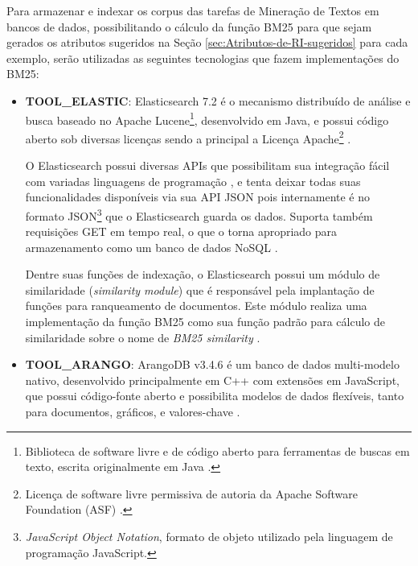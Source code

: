     Para armazenar e indexar os corpus das tarefas de Mineração de Textos em bancos de dados, possibilitando o cálculo da função BM25 para que sejam gerados os atributos sugeridos na Seção \ref{sec:Atributos-de-RI-sugeridos} para cada exemplo, serão utilizadas as seguintes tecnologias que fazem implementações do BM25:
    \begin{itemize}
        \item \textbf{TOOL\_ELASTIC}: Elasticsearch 7.2 é o mecanismo distribuído de análise e busca baseado no Apache Lucene\footnote{Biblioteca de software livre e de código aberto para ferramentas de buscas em texto, escrita originalmente em Java \cite{LUCENE_DOCUMENTATION_2019}.}, desenvolvido em Java, e possui código aberto sob diversas licenças sendo a principal a Licença Apache\footnote{Licença de software livre permissiva de autoria da Apache Software Foundation (ASF) \cite{NEWMEDIA_OPENGUIDE_2015}.} \cite{ELASTIC_GitHub_2019, ELASTIC_REFERENCE_INTRO_2019}.  %
        
        O Elasticsearch possui diversas APIs que possibilitam sua integração fácil com variadas linguagens de programação \cite{ELASTIC_GitHub_2019}, e tenta deixar todas suas funcionalidades disponíveis via sua API JSON pois internamente é no formato JSON\footnote{\textit{JavaScript Object Notation}, formato de objeto utilizado pela linguagem de programação JavaScript.} que o Elasticsearch guarda os dados. 
        Suporta também requisições GET em tempo real, o que o torna apropriado para armazenamento como um banco de dados NoSQL \cite{PETER_ELASTICDB_2011, VOLKAN_ELASTIC_DATASTORE_2018}.
        
        Dentre suas funções de indexação, o Elasticsearch possui um módulo de similaridade (\textit{similarity module}) que é responsável pela implantação de funções para ranqueamento de documentos.
        Este módulo realiza uma implementação da função BM25 como sua função padrão para cálculo de similaridade sobre o nome de \textit{BM25 similarity} \cite{ELASTIC_REFERENCE_SIMILARITY_2019}.
        
        \item \textbf{TOOL\_ARANGO}: ArangoDB v3.4.6 é um banco de dados multi-modelo nativo, desenvolvido principalmente em C++ com extensões em JavaScript, que possui código-fonte aberto e possibilita modelos de dados flexíveis, tanto para documentos, gráficos, e valores-chave \cite{ARANGODB_DOC_2019, ARANGODB_GitHub_2019}.
        

\end{itemize}
